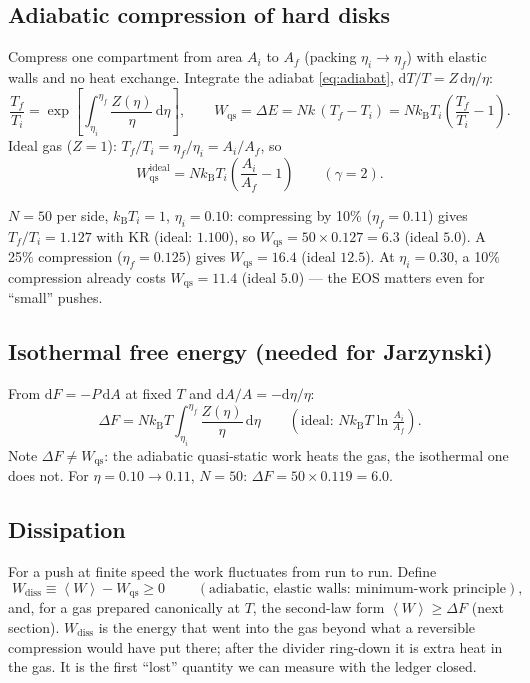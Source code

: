 \documentclass[11pt,a4paper]{article}
\newcommand{\kT}{k_{\mathrm B}T}
\newcommand{\avg}[1]{\left\langle #1 \right\rangle}
\newcommand{\dd}{\mathrm{d}}
\begin{document}
\subsection{Adiabatic compression of hard disks}
Compress one compartment from area $A_i$ to $A_f$ (packing $\eta_i\to\eta_f$) with elastic walls and no heat exchange. Integrate the adiabat \eqref{eq:adiabat}, $\dd T/T = Z\,\dd\eta/\eta$:
\begin{equation}
\frac{T_f}{T_i} = \exp\!\left[\int_{\eta_i}^{\eta_f} \frac{Z(\eta)}{\eta}\,\dd\eta\right],
\qquad
W_{\mathrm{qs}} = \Delta E = Nk\,(T_f - T_i) = N\kT_i\left(\frac{T_f}{T_i} - 1\right).
\label{eq:Wqs}
\end{equation}
Ideal gas ($Z = 1$): $T_f/T_i = \eta_f/\eta_i = A_i/A_f$, so
\begin{equation}
W_{\mathrm{qs}}^{\mathrm{ideal}} = N\kT_i\left(\frac{A_i}{A_f} - 1\right)\qquad(\gamma = 2).
\end{equation}
\begin{worked}
$N = 50$ per side, $\kT_i = 1$, $\eta_i = 0.10$: compressing by 10\% ($\eta_f = 0.11$) gives $T_f/T_i = 1.127$ with KR (ideal: $1.100$), so $W_{\mathrm{qs}} = 50\times0.127 = 6.3$ (ideal $5.0$). A 25\% compression ($\eta_f = 0.125$) gives $W_{\mathrm{qs}} = 16.4$ (ideal $12.5$). At $\eta_i = 0.30$, a 10\% compression already costs $W_{\mathrm{qs}} = 11.4$ (ideal $5.0$) --- the EOS matters even for ``small'' pushes.
\end{worked}

\subsection{Isothermal free energy (needed for Jarzynski)}
From $\dd F = -P\,\dd A$ at fixed $T$ and $\dd A/A = -\dd\eta/\eta$:
\begin{equation}
\Delta F = N\kT\int_{\eta_i}^{\eta_f}\frac{Z(\eta)}{\eta}\,\dd\eta
\qquad(\text{ideal: } N\kT\ln\tfrac{A_i}{A_f}).
\label{eq:dF}
\end{equation}
Note $\Delta F \ne W_{\mathrm{qs}}$: the adiabatic quasi-static work heats the gas, the isothermal one does not. For $\eta = 0.10\to0.11$, $N = 50$: $\Delta F = 50\times0.119 = 6.0$.

\subsection{Dissipation}
For a push at finite speed the work fluctuates from run to run. Define
\begin{equation}
\boxed{\;W_{\mathrm{diss}} \equiv \avg{W} - W_{\mathrm{qs}} \ge 0\;}
\qquad(\text{adiabatic, elastic walls: minimum-work principle}),
\end{equation}
and, for a gas prepared canonically at $T$, the second-law form $\avg{W} \ge \Delta F$ (next section). $W_{\mathrm{diss}}$ is the energy that went into the gas beyond what a reversible compression would have put there; after the divider ring-down it is extra heat in the gas. It is the first ``lost'' quantity we can measure with the ledger closed.
\end{document}
